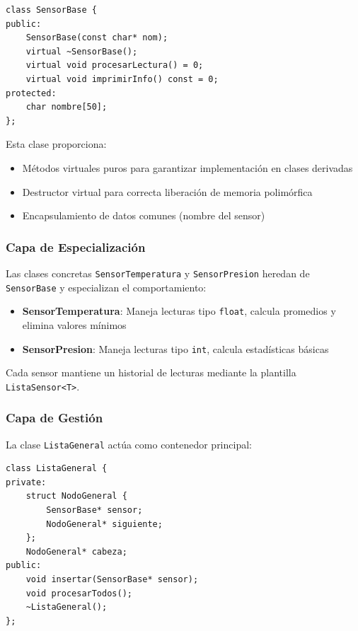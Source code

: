 \documentclass[conference]{IEEEtran}
\begin{document}
\vspace{0.3cm}
\begin{lstlisting}
class SensorBase {
public:
    SensorBase(const char* nom);
    virtual ~SensorBase();
    virtual void procesarLectura() = 0;
    virtual void imprimirInfo() const = 0;
protected:
    char nombre[50];
};
\end{lstlisting}
\vspace{0.2cm}

Esta clase proporciona:
\begin{itemize}
    \item Métodos virtuales puros para garantizar implementación en clases derivadas
    \item Destructor virtual para correcta liberación de memoria polimórfica
    \item Encapsulamiento de datos comunes (nombre del sensor)
\end{itemize}

\subsubsection{Capa de Especialización}

Las clases concretas \texttt{SensorTemperatura} y \texttt{SensorPresion} heredan de \texttt{SensorBase} y especializan el comportamiento:

\begin{itemize}
    \item \textbf{SensorTemperatura}: Maneja lecturas tipo \texttt{float}, calcula promedios y elimina valores mínimos
    \item \textbf{SensorPresion}: Maneja lecturas tipo \texttt{int}, calcula estadísticas básicas
\end{itemize}

Cada sensor mantiene un historial de lecturas mediante la plantilla \texttt{ListaSensor<T>}.

\subsubsection{Capa de Gestión}

La clase \texttt{ListaGeneral} actúa como contenedor principal:

\vspace{0.3cm}
\begin{lstlisting}
class ListaGeneral {
private:
    struct NodoGeneral {
        SensorBase* sensor;
        NodoGeneral* siguiente;
    };
    NodoGeneral* cabeza;
public:
    void insertar(SensorBase* sensor);
    void procesarTodos();
    ~ListaGeneral();
};
\end{lstlisting}
\vspace{0.2cm}
\end{document}
